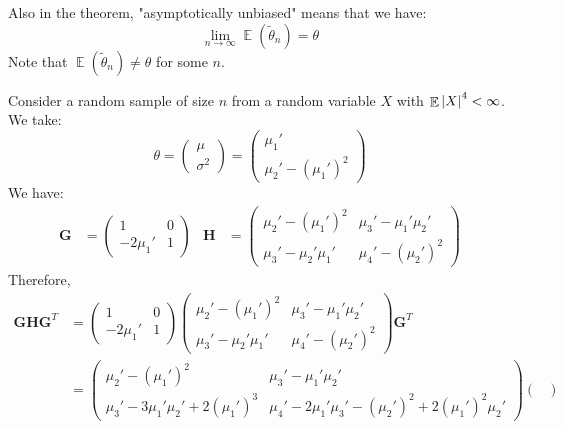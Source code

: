 \documentclass{huhtakm-template-book-v2}
\DeclareMathOperator{\E}{\mathbb{E}}
\begin{document}
\newpage
\begin{rem}
	Also in the theorem, "asymptotically unbiased" means that we have:
	\begin{equation*}
		\lim_{n\to\infty}\E(\widetilde{\theta}_{n})=\theta
	\end{equation*}
	Note that $\E(\widetilde{\theta}_{n})\neq\theta$ for some $n$.
\end{rem}
\begin{eg}
	Consider a random sample of size $n$ from a random variable $X$ with $\E\abs{X}^{4}<\infty$. We take:
	\begin{equation*}
		\theta=\begin{pmatrix}
			\mu\\ \sigma^{2}
		\end{pmatrix}=\begin{pmatrix}
			\mu_{1}'\\ \mu_{2}'-(\mu_{1}')^{2}
		\end{pmatrix}
	\end{equation*}
	We have:
	\begin{align*}
		\mathbf{G}&=\begin{pmatrix}
			1 & 0\\
			-2\mu_{1}' & 1
		\end{pmatrix} & \mathbf{H}&=\begin{pmatrix}
			\mu_{2}'-(\mu_{1}')^{2} & \mu_{3}'-\mu_{1}'\mu_{2}'\\
			\mu_{3}'-\mu_{2}'\mu_{1}' & \mu_{4}'-(\mu_{2}')^{2}
		\end{pmatrix}
	\end{align*}
	Therefore,
	\begin{align*}
		\mathbf{GHG}^{T}&=\begin{pmatrix}
			1 & 0\\
			-2\mu_{1}' & 1
		\end{pmatrix}\begin{pmatrix}
		\mu_{2}'-(\mu_{1}')^{2} & \mu_{3}'-\mu_{1}'\mu_{2}'\\
		\mu_{3}'-\mu_{2}'\mu_{1}' & \mu_{4}'-(\mu_{2}')^{2}
		\end{pmatrix}\mathbf{G}^{T}\\
		&=\begin{pmatrix}
			\mu_{2}'-(\mu_{1}')^{2} & \mu_{3}'-\mu_{1}'\mu_{2}'\\
			\mu_{3}'-3\mu_{1}'\mu_{2}'+2(\mu_{1}')^{3} & \mu_{4}'-2\mu_{1}'\mu_{3}'-(\mu_{2}')^{2}+2(\mu_{1}')^{2}\mu_{2}'
		\end{pmatrix}\begin{pmatrix}

\end{pmatrix}
\end{align*}
\end{eg}
\end{document}
